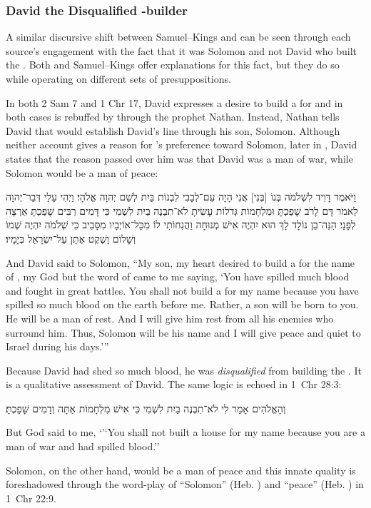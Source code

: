 \subsubsection{David the Disqualified \temple-builder}
A similar discursive shift between Samuel--Kings and \chronicles can be seen through each source's engagement with the fact that it was Solomon and not David who built the \temple. Both \chronicles and Samuel--Kings offer explanations for this fact, but they do so while operating on different sets of presuppositions. 

In both 2 Sam 7 and 1 Chr 17, David expresses a desire to build a \temple for \yahweh and in both cases is rebuffed by \yahweh through the prophet Nathan. Instead, Nathan tells David that \yahweh would establish David's line through his son, Solomon. Although neither account gives a reason for \yahweh's preference toward Solomon, later in \chronicles, David states that the reason \yahweh passed over him was that David was a man of war, while Solomon would be a man of peace:
\begin{hebrewtext}
    וַיֹּאמֶר דָּוִיד לִשְׁלֹמֹה בְּנוֹ [בְּנִי] אֲנִי הָיָה עִם־לְבָבִי לִבְנוֹת בַּיִת לְשֵׁם יְהוָה אֱלֹהָי׃ 
    וַיְהִי עָלַי דְּבַר־יְהוָה לֵאמֹר דָּם לָרֹב שָׁפַכְתָּ וּמִלְחָמוֹת גְּדֹלוֹת עָשִׂיתָ לֹא־תִבְנֶה בַיִת לִשְׁמִי כִּי דָּמִים רַבִּים שָׁפַכְתָּ אַרְצָה לְפָנָי׃
    הִנֵּה־בֵן נוֹלָד לָךְ הוּא יִהְיֶה אִישׁ מְנוּחָה וַהֲנִחוֹתִי לוֹ מִכָּל־אוֹיְבָיו מִסָּבִיב כִּי שְׁלֹמֹה יִהְיֶה שְׁמוֹ וְשָׁלוֹם וָשֶׁקֶט אֶתֵּן עַל־יִשְׂרָאֵל בְּיָמָיו׃
\end{hebrewtext}
\begin{translation}
    And David said to Solomon, ``My son, my heart desired to build a \temple for the name of \yahweh, my God
    but the word of \yahweh came to me saying, `You have spilled much blood and fought in great battles. You shall not build a \temple for my name because you have spilled so much blood on the earth before me.
    Rather, a son will be born to you. He will be a man of rest. And I will give him rest from all his enemies who surround him. Thus, Solomon will be his name and I will give peace and quiet to Israel during his days.'''
\end{translation}
\noindent
Because David had shed so much blood, he was \emph{disqualified} from building the \temple. It is a qualitative assessment of David. The same logic is echoed in 1~Chr 28:3: 
\begin{hebrewtext}
    וְהָאֱלֹהִים אָמַר לִי לֹא־תִבְנֶה בַיִת לִשְׁמִי כִּי אִישׁ מִלְחָמוֹת אַתָּה וְדָמִים שָׁפָכְתָּ׃
\end{hebrewtext}
\begin{translation}
    But God said to me, `'`You shall not built a house for my name because you are a man of war and had spilled blood.''
\end{translation}
\noindent
Solomon, on the other hand, would be a man of peace and this innate quality is foreshadowed through the word-play of ``Solomon'' (Heb. ) and ``peace'' (Heb. ) in 1~Chr 22:9.

